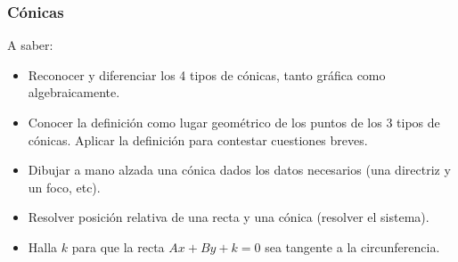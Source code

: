 \subsubsection{Cónicas}
A saber:
\begin{itemize}
	\item Reconocer y diferenciar los 4 tipos de cónicas, tanto gráfica como algebraicamente.
	\item Conocer la definición como lugar geométrico de los puntos de los 3 tipos de cónicas.
	\subitem Aplicar la definición para contestar cuestiones breves.
	\item Dibujar a mano alzada una cónica dados los datos necesarios (una directriz y un foco, etc).
	\item Resolver posición relativa de una recta y una cónica (resolver el sistema).
	\item Halla $k$ para que la recta $Ax+By+k=0$ sea tangente a la circunferencia.

\end{itemize}

